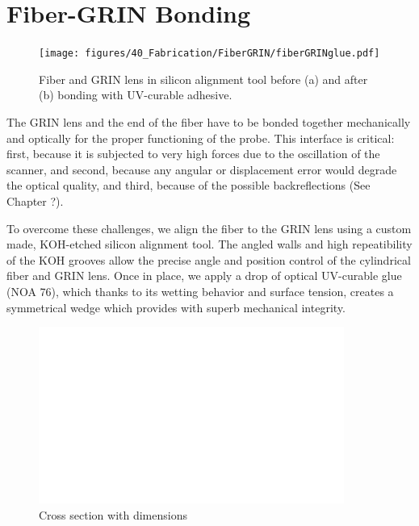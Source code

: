 \clearpage
\section{Fiber-GRIN Bonding}
\begin{figure}[h!]\centering \texttt{[image: figures/40\_Fabrication/FiberGRIN/fiberGRINglue.pdf]}
      \caption{Fiber and GRIN lens in silicon alignment tool before (a) and after (b) bonding with UV-curable adhesive.}
      \label{fig:fiberGRINglue}
\end{figure}

The GRIN lens and the end of the fiber have to be bonded together mechanically and optically for the proper functioning of the probe. This interface is critical: first, because it is subjected to very high forces due to the oscillation of the scanner, and second, because any angular or displacement error would degrade the optical quality, and third, because of the possible backreflections (See Chapter ?). 

To overcome these challenges, we align the fiber to the GRIN lens using a custom made, KOH-etched silicon alignment tool. The angled walls and high repeatibility of the KOH grooves allow the precise angle and position control of the cylindrical fiber and GRIN lens. Once in place, we apply a drop of optical UV-curable glue (NOA 76), which thanks to its wetting behavior and surface tension, creates a symmetrical wedge which provides with superb mechanical integrity.


\begin{figure}[h!]\centering \includegraphics[width=10cm,draft]{figures/foo.png}
      \caption{Cross section with dimensions}
\end{figure}


\clearpage
